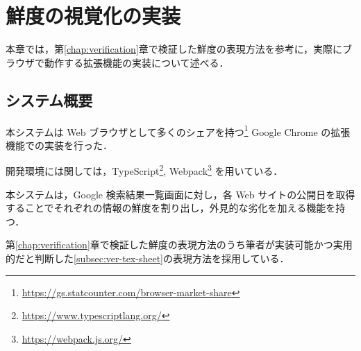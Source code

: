 \chapter{鮮度の視覚化の実装}
\label{chap:implementation}

本章では，第\ref{chap:verification}章で検証した鮮度の表現方法を参考に，実際にブラウザで動作する拡張機能の実装について述べる．

\newpage

\section{システム概要}
\label{sec:imp_system}

本システムは Web ブラウザとして多くのシェアを持つ\footnote{\url{https://gs.statcounter.com/browser-market-share}} Google Chrome の拡張機能での実装を行った．

開発環境には関しては，TypeScript\footnote{\url{https://www.typescriptlang.org/}}, Webpack\footnote{\url{https://webpack.js.org/}} を用いている．

本システムは，Google 検索結果一覧画面に対し，各 Web サイトの公開日を取得することでそれぞれの情報の鮮度を割り出し，外見的な劣化を加える機能を持つ．

第\ref{chap:verification}章で検証した鮮度の表現方法のうち筆者が実装可能かつ実用的だと判断した\ref{subsec:ver-tex-sheet}の表現方法を採用している．

